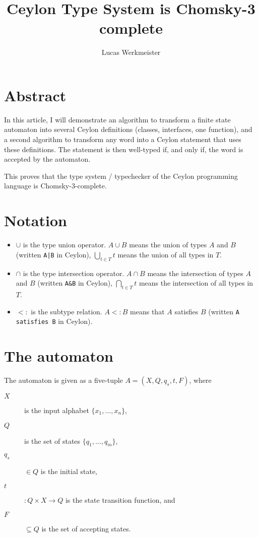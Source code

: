 \documentclass[a4paper, 11pt]{article}
\newcommand{\code}[1]{\texttt{#1}}
\theoremstyle{definition}
\begin{document}
\author{Lucas Werkmeister}
\title{Ceylon Type System is Chomsky-3 complete}

\maketitle
\tableofcontents

\section{Abstract}

In this article, I will demonstrate an algorithm to transform a finite state automaton into several Ceylon definitions (classes, interfaces, one function), and a second algorithm to transform any word into a Ceylon statement that uses these definitions.
The statement is then well-typed if, and only if, the word is accepted by the automaton.

This proves that the type system / typechecker of the Ceylon programming language is Chomsky-3-complete.

\section{Notation}

\begin{itemize}
\item $\cup$ is the type union operator. $A\cup B$ means the union of types $A$ and $B$ (written \code{A|B} in Ceylon), $\bigcup\limits_{t\in T}t$ means the union of all types in $T$.
\item $\cap$ is the type intersection operator. $A\cap B$ means the intersection of types $A$ and $B$ (written \code{A\&B} in Ceylon), $\bigcap\limits_{t\in T}t$ means the intersection of all types in $T$.
\item $<:$ is the subtype relation. $A<:B$ means that $A$ satisfies $B$ (written \code{A satisfies B} in Ceylon).
\end{itemize}

\section{The automaton}

The automaton is given as a five-tuple $A=(X,Q,q_s,t,F)$, where
\begin{description}
\item[$X$] is the input alphabet $\{x_1,\ldots,x_n\}$,
\item[$Q$] is the set of states $\{q_1,\ldots,q_m\}$,
\item[$q_s$] $\in Q$ is the initial state,
\item[$t$]$: Q\times X\to Q$ is the state transition function, and
\item[$F$] $\subseteq Q$ is the set of accepting states.
\end{description}
\end{document}
